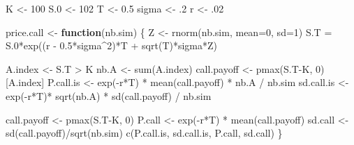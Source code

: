 \documentclass[12pt,]{tufte-book}
\newenvironment{Shaded}{}{}
\newcommand{\AttributeTok}[1]{\textcolor[rgb]{0.49,0.56,0.16}{#1}}
\newcommand{\ControlFlowTok}[1]{\textcolor[rgb]{0.00,0.44,0.13}{\textbf{#1}}}
\newcommand{\DecValTok}[1]{\textcolor[rgb]{0.25,0.63,0.44}{#1}}
\newcommand{\FloatTok}[1]{\textcolor[rgb]{0.25,0.63,0.44}{#1}}
\newcommand{\FunctionTok}[1]{\textcolor[rgb]{0.02,0.16,0.49}{#1}}
\newcommand{\NormalTok}[1]{#1}
\newcommand{\OtherTok}[1]{\textcolor[rgb]{0.00,0.44,0.13}{#1}}
\newcommand{\SpecialCharTok}[1]{\textcolor[rgb]{0.25,0.44,0.63}{#1}}
\begin{document}
\begin{Shaded}
\begin{Highlighting}[]
\NormalTok{K }\OtherTok{\textless{}{-}} \DecValTok{100}
\NormalTok{S}\FloatTok{.0} \OtherTok{\textless{}{-}} \DecValTok{102}
\NormalTok{T }\OtherTok{\textless{}{-}} \FloatTok{0.5}
\NormalTok{sigma }\OtherTok{\textless{}{-}}\NormalTok{ .}\DecValTok{2}
\NormalTok{r }\OtherTok{\textless{}{-}}\NormalTok{ .}\DecValTok{02}

\NormalTok{price.call }\OtherTok{\textless{}{-}} \ControlFlowTok{function}\NormalTok{(nb.sim) \{}
\NormalTok{Z }\OtherTok{\textless{}{-}} \FunctionTok{rnorm}\NormalTok{(nb.sim, }\AttributeTok{mean=}\DecValTok{0}\NormalTok{, }\AttributeTok{sd=}\DecValTok{1}\NormalTok{)}
\NormalTok{S.T }\OtherTok{=}\NormalTok{ S}\FloatTok{.0}\SpecialCharTok{*}\FunctionTok{exp}\NormalTok{((r }\SpecialCharTok{{-}} \FloatTok{0.5}\SpecialCharTok{*}\NormalTok{sigma}\SpecialCharTok{\^{}}\DecValTok{2}\NormalTok{)}\SpecialCharTok{*}\NormalTok{T }\SpecialCharTok{+} \FunctionTok{sqrt}\NormalTok{(T)}\SpecialCharTok{*}\NormalTok{sigma}\SpecialCharTok{*}\NormalTok{Z)}

\NormalTok{A.index }\OtherTok{\textless{}{-}}\NormalTok{ S.T }\SpecialCharTok{\textgreater{}}\NormalTok{ K}
\NormalTok{nb.A }\OtherTok{\textless{}{-}} \FunctionTok{sum}\NormalTok{(A.index)}
\NormalTok{call.payoff }\OtherTok{\textless{}{-}} \FunctionTok{pmax}\NormalTok{(S.T}\SpecialCharTok{{-}}\NormalTok{K, }\DecValTok{0}\NormalTok{)[A.index]}
\NormalTok{P.call.is }\OtherTok{\textless{}{-}} \FunctionTok{exp}\NormalTok{(}\SpecialCharTok{{-}}\NormalTok{r}\SpecialCharTok{*}\NormalTok{T) }\SpecialCharTok{*} \FunctionTok{mean}\NormalTok{(call.payoff) }\SpecialCharTok{*}\NormalTok{ nb.A }\SpecialCharTok{/}\NormalTok{ nb.sim}
\NormalTok{sd.call.is }\OtherTok{\textless{}{-}} \FunctionTok{exp}\NormalTok{(}\SpecialCharTok{{-}}\NormalTok{r}\SpecialCharTok{*}\NormalTok{T)}\SpecialCharTok{*} \FunctionTok{sqrt}\NormalTok{(nb.A) }\SpecialCharTok{*} \FunctionTok{sd}\NormalTok{(call.payoff) }\SpecialCharTok{/}\NormalTok{ nb.sim}

\NormalTok{call.payoff }\OtherTok{\textless{}{-}} \FunctionTok{pmax}\NormalTok{(S.T}\SpecialCharTok{{-}}\NormalTok{K, }\DecValTok{0}\NormalTok{)}
\NormalTok{P.call }\OtherTok{\textless{}{-}} \FunctionTok{exp}\NormalTok{(}\SpecialCharTok{{-}}\NormalTok{r}\SpecialCharTok{*}\NormalTok{T) }\SpecialCharTok{*} \FunctionTok{mean}\NormalTok{(call.payoff)}
\NormalTok{sd.call }\OtherTok{\textless{}{-}} \FunctionTok{sd}\NormalTok{(call.payoff)}\SpecialCharTok{/}\FunctionTok{sqrt}\NormalTok{(nb.sim)}
\FunctionTok{c}\NormalTok{(P.call.is, sd.call.is, P.call, sd.call)}
\NormalTok{\}}


\end{Highlighting}
\end{Shaded}
\end{document}
